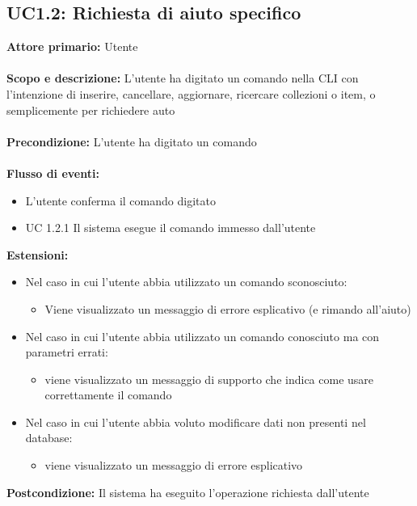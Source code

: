 \documentclass{scalatekids-article}
\begin{document}
\subsection{UC1.2: Richiesta di aiuto specifico}
\textbf{Attore primario:} Utente \\ \\
\textbf{Scopo e descrizione:}  L’utente ha digitato un comando nella CLI con l’intenzione di inserire, cancellare, aggiornare, ricercare collezioni o item, o semplicemente per richiedere auto\\ \\
\textbf{Precondizione:} L’utente ha digitato un comando\\ \\
\textbf{Flusso di eventi:}
\begin{itemize}
\item L’utente conferma il comando digitato
\item UC 1.2.1 Il sistema esegue il comando immesso dall’utente
\end{itemize}
\textbf{Estensioni:}
\begin{itemize}
\item Nel caso in cui l’utente abbia utilizzato un comando sconosciuto:
  \begin{itemize}
  \item Viene visualizzato un messaggio di errore esplicativo (e rimando all'aiuto)
  \end{itemize}
\item Nel caso in cui l’utente abbia utilizzato un comando conosciuto ma con parametri errati:
  \begin{itemize}
  \item viene visualizzato un messaggio di supporto che indica come usare correttamente il comando
  \end{itemize}
\item Nel caso in cui l’utente abbia voluto modificare dati non presenti nel database:
  \begin{itemize}
    \item viene visualizzato un messaggio di errore esplicativo
  \end{itemize}
\end{itemize}
\textbf{Postcondizione:} Il sistema ha eseguito l’operazione richiesta dall’utente
\end{document}
